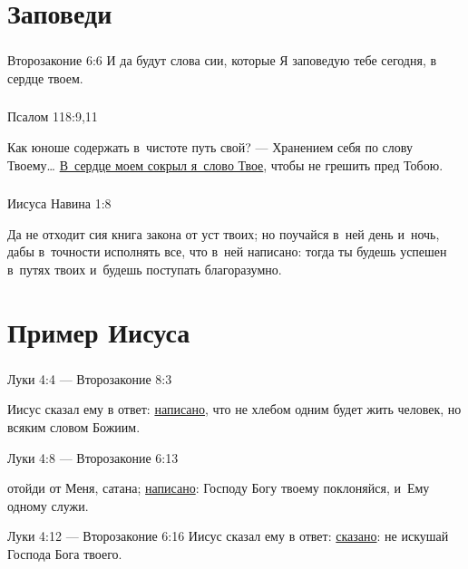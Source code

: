 \documentclass[t,aspectratio=169,14pt]{beamer}  %
\def\hy#1{\parbox{\linewidth}{#1}} %
\begin{document}
\section{Заповеди}
\begin{frame}
	\frametitle{\insertsection}

	\begin{block}{Второзаконие 6:6}
	И да будут слова сии, которые Я заповедую тебе сегодня, в сердце твоем. 
	\end{block}

\end{frame}  
\begin{frame}
	\frametitle{\insertsection}


	\begin{block}{Псалом 118:9,11}
	\hy{Как юноше содержать в~чистоте путь свой? --- Хранением себя по слову Твоему\ldots{} 
	\underline{В~сердце моем сокрыл я~слово Твое}, чтобы не грешить пред Тобою. }
	\end{block}	

\end{frame}  
\begin{frame}
	\frametitle{\insertsection}

	\begin{block}{Иисуса Навина 1:8}
		\hy{Да не отходит сия книга закона от уст твоих; но поучайся в~ней день и~ночь, дабы в~точности исполнять все, что в~ней написано: тогда ты будешь успешен в~путях твоих и~будешь поступать благоразумно.}
	\end{block}
\end{frame}  
\section{Пример Иисуса}
\begin{frame}
	\frametitle{\insertsection}

\begin{block}{Луки 4:4 --- Второзаконие 8:3}
\hy{Иисус сказал ему в ответ: \underline{написано}, что не хлебом одним будет жить человек, но всяким словом Божиим. }
\end{block}

\begin{block}{Луки 4:8 --- Второзаконие 6:13}
	\hy{отойди от Меня, сатана; \underline{написано}: Господу Богу твоему поклоняйся, и~Ему одному служи. }
\end{block}

\begin{block}{Луки 4:12 --- Второзаконие 6:16}
Иисус сказал ему в ответ: \underline{сказано}: не искушай Господа Бога твоего. 
\end{block}

\end{frame}    
\end{document}
